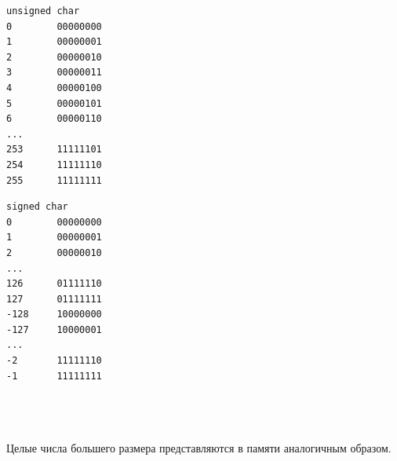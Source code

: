 \documentclass{article}
\begin{document}
\begin{minipage}{0.4\textwidth}
\begin{verbatim}
unsigned char
0        00000000
1        00000001
2        00000010
3        00000011
4        00000100
5        00000101
6        00000110
...
253      11111101
254      11111110
255      11111111
\end{verbatim}
\end{minipage}
\begin{minipage}{0.4\textwidth}
\begin{verbatim}
signed char
0        00000000
1        00000001
2        00000010
...
126      01111110
127      01111111
-128     10000000
-127     10000001
...
-2       11111110
-1       11111111
\end{verbatim}
\end{minipage}\\
\quad\\
\quad\\
Целые числа большего размера представляются в памяти аналогичным образом.
\end{document}
